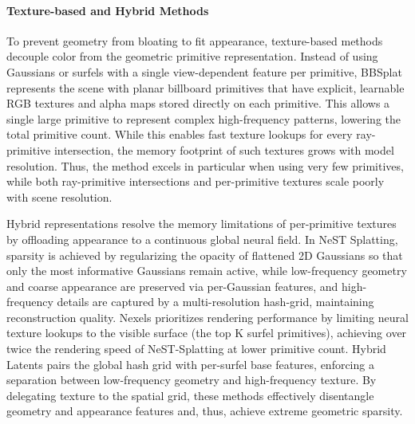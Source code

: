 \documentclass[acmtog,anonymous,review]{acmart}
\begin{document}
\paragraph{\textbf{Texture-based and Hybrid Methods}}
To prevent geometry from bloating to fit appearance, texture-based methods decouple color from the geometric primitive representation. Instead of using Gaussians or surfels with a single view-dependent feature per primitive, BBSplat represents the scene with planar billboard primitives that have explicit, learnable RGB textures and alpha maps stored directly on each primitive. This allows a single large primitive to represent complex high-frequency patterns, lowering the total primitive count. While this enables fast texture lookups for every ray-primitive intersection, the memory footprint of such textures grows with model resolution. Thus, the method excels in particular when using very few primitives, while both ray-primitive intersections and per-primitive textures scale poorly with scene resolution. 



Hybrid representations resolve the memory limitations of per-primitive textures by offloading appearance to a continuous global neural field. In NeST Splatting, sparsity is achieved by regularizing the opacity of flattened 2D Gaussians so that only the most informative Gaussians remain active, while low-frequency geometry and coarse appearance are preserved via per-Gaussian features, and high-frequency details are captured by a multi-resolution hash-grid, maintaining reconstruction quality. Nexels prioritizes rendering performance by limiting neural texture lookups to the visible surface (the top K surfel primitives), achieving over twice the rendering speed of NeST-Splatting at lower primitive count. Hybrid Latents pairs the global hash grid with per-surfel base features, enforcing a separation between low-frequency geometry and high-frequency texture. By delegating texture to the spatial grid, these methods effectively disentangle geometry and appearance features and, thus, achieve extreme geometric sparsity. 
\end{document}
